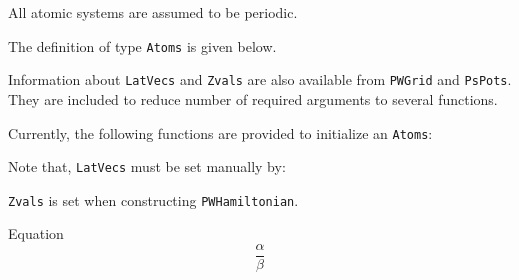 All atomic systems are assumed to be periodic.

The definition of type \texttt{Atoms} is given below.

\begin{Shaded}
\begin{Highlighting}[]
\NormalTok{\{}\NormalTok{,}\NormalTok{\}}
\NormalTok{\{}\NormalTok{,}\NormalTok{\}}
\NormalTok{\{}\NormalTok{,}\NormalTok{\}}
\NormalTok{\{}\NormalTok{,}\NormalTok{\}}
\NormalTok{\{}\NormalTok{,}\NormalTok{\}}
\NormalTok{\{}\NormalTok{,}\NormalTok{\}}
\end{Highlighting}
\end{Shaded}

Information about \texttt{LatVecs} and \texttt{Zvals} are also available
from \texttt{PWGrid} and \texttt{PsPots}. They are included to reduce
number of required arguments to several functions.

Currently, the following functions are provided to initialize an
\texttt{Atoms}:

\begin{Shaded}
\begin{Highlighting}[]
\end{Highlighting}
\end{Shaded}

Note that, \texttt{LatVecs} must be set manually by:

\begin{Shaded}
\begin{Highlighting}[]
\NormalTok{) }
\end{Highlighting}
\end{Shaded}

\texttt{Zvals} is set when constructing \texttt{PWHamiltonian}.

Equation \begin{equation}
\frac{\alpha}{\beta}
\end{equation}
